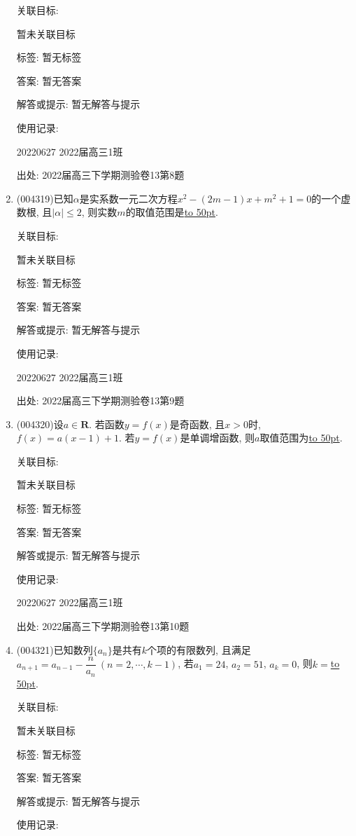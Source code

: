 \documentclass[10pt,a4paper]{article}
\newcommand{\blank}[1]{\underline{\hbox to #1pt{}}}
\begin{document}
\begin{enumerate}[1.]
关联目标:

暂未关联目标



标签: 暂无标签

答案: 暂无答案

解答或提示: 暂无解答与提示

使用记录:

20220627	2022届高三1班	


出处: 2022届高三下学期测验卷13第8题
\item { (004319)}已知$\alpha$是实系数一元二次方程$x^2-(2m-1)x+m^2+1=0$的一个虚数根, 且$|\alpha|\le 2$, 则实数$m$的取值范围是\blank{50}.


关联目标:

暂未关联目标



标签: 暂无标签

答案: 暂无答案

解答或提示: 暂无解答与提示

使用记录:

20220627	2022届高三1班	


出处: 2022届高三下学期测验卷13第9题
\item { (004320)}设$a\in \mathbf{R}$. 若函数$y=f(x)$是奇函数, 且$x>0$时, $f(x)=a(x-1)+1$. 若$y=f(x)$是单调增函数, 则$a$取值范围为\blank{50}.


关联目标:

暂未关联目标



标签: 暂无标签

答案: 暂无答案

解答或提示: 暂无解答与提示

使用记录:

20220627	2022届高三1班	


出处: 2022届高三下学期测验卷13第10题
\item { (004321)}已知数列$\{a_n\}$是共有$k$个项的有限数列, 且满足$a_{n+1}=a_{n-1}-\dfrac n{a_n}\ (n=2,\cdots,k-1)$, 若$a_1=24$, $a_2=51$, $a_k=0$, 则$k=$\blank{50}.


关联目标:

暂未关联目标



标签: 暂无标签

答案: 暂无答案

解答或提示: 暂无解答与提示

使用记录:


\end{enumerate}
\end{document}
